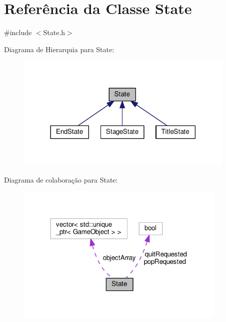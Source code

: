 \hypertarget{classState}{\section{Referência da Classe State}
\label{classState}
}


{\ttfamily \#include $<$State.\+h$>$}



Diagrama de Hierarquia para State\+:\nopagebreak
\begin{figure}[H]
\begin{center}
\leavevmode
\includegraphics[width=297pt]{classState__inherit__graph}
\end{center}
\end{figure}


Diagrama de colaboração para State\+:
\nopagebreak
\begin{figure}[H]
\begin{center}
\leavevmode
\includegraphics[width=286pt]{classState__coll__graph}
\end{center}
\end{figure}
